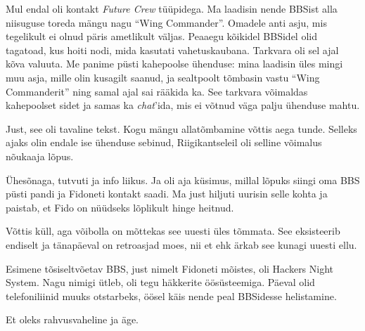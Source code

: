 Mul endal oli kontakt \emph{Future Crew} tüüpidega. Ma laadisin nende BBSist alla niisuguse 
toreda mängu nagu \enquote{Wing Commander}. 
Omadele anti asju, mis tegelikult ei olnud
päris ametlikult väljas. Peaaegu kõikidel BBSidel olid tagatoad, 
kus hoiti nodi, mida kasutati vahetuskaubana. Tarkvara oli sel 
ajal kõva valuuta. Me panime püsti kahepoolse ühenduse: mina 
laadisin üles mingi muu asja, mille olin kusagilt saanud, ja 
sealtpoolt tõmbasin vastu \enquote{Wing Commanderit} ning samal ajal sai rääkida ka. 
See tarkvara võimaldas kahepoolset sidet ja samas ka 
\emph{chat}'ida, mis ei võtnud väga palju ühenduse mahtu.


Just, see oli tavaline tekst. Kogu mängu allatõmbamine võttis 
aega tunde. Selleks ajaks olin endale ise ühenduse sebinud, Riigikantseleil oli
selline võimalus nõukaaja lõpus. 

Ühesõnaga, tutvuti ja info liikus. Ja oli aja küsimus, millal lõpuks siingi 
oma BBS püsti pandi ja Fidoneti kontakt saadi. Ma just hiljuti uurisin selle 
kohta ja paistab, et Fido on nüüdseks lõplikult hinge heitnud.


Võttis küll, aga võibolla on mõttekas see uuesti üles tõmmata. See eksisteerib endiselt ja 
tänapäeval on retroasjad moes, nii et ehk ärkab see kunagi uuesti ellu.


Esimene tõsiseltvõetav BBS, just nimelt Fidoneti mõistes, oli Hackers Night 
System. Nagu 
nimigi ütleb, oli tegu häkkerite öösüsteemiga. Päeval olid telefoniliinid muuks 
otstarbeks, öösel käis nende peal BBSidesse helistamine. 


Et oleks rahvusvaheline ja äge.

